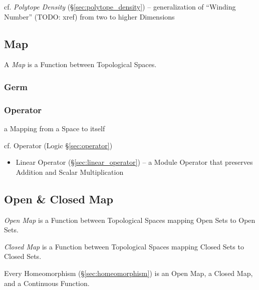 \fist cf. \emph{Polytope Density} (\S\ref{sec:polytope_density}) --
generalization of ``Winding Number'' (TODO: xref) from two to higher Dimensions



\subsection{Map}\label{sec:topology_map}

A \emph{Map} is a Function between Topological Spaces.



\subsubsection{Germ}\label{sec:germ}

\subsubsection{Operator}\label{sec:space_operator}

a Mapping from a Space to itself

cf. Operator (Logic \S\ref{sec:operator})

\begin{itemize}
  \item Linear Operator (\S\ref{sec:linear_operator}) -- a Module Operator that
    preserves Addition and Scalar Multiplication
\end{itemize}



\subsection{Open \& Closed Map}\label{sec:open_closed_map}

\emph{Open Map} is a Function between Topological Spaces mapping Open
Sets to Open Sets.

\emph{Closed Map} is a Function between Topological Spaces mapping Closed
Sets to Closed Sets.

Every Homeomorphism (\S\ref{sec:homeomorphism}) is an Open Map, a
Closed Map, and a Continuous Function.



